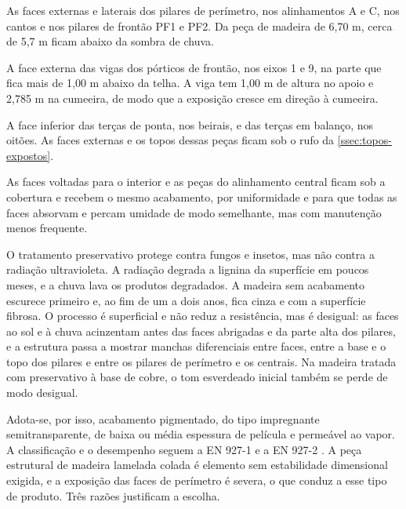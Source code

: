 \begin{alineas}
    \item As faces externas e laterais dos pilares de perímetro, nos alinhamentos
          A e C, nos cantos e nos pilares de frontão PF1 e PF2. Da peça de
          madeira de 6,70 m, cerca de 5,7 m ficam abaixo da sombra de chuva.
    \item A face externa das vigas dos pórticos de frontão, nos eixos 1 e 9, na
          parte que fica mais de 1,00 m abaixo da telha. A viga tem 1,00 m de
          altura no apoio e 2,785 m na cumeeira, de modo que a exposição cresce
          em direção à cumeeira.
    \item A face inferior das terças de ponta, nos beirais, e das terças em
          balanço, nos oitões. As faces externas e os topos dessas peças ficam
          sob o rufo da \autoref{ssec:topos-expostos}.
\end{alineas}

As faces voltadas para o interior e as peças do alinhamento central ficam sob a
cobertura e recebem o mesmo acabamento, por uniformidade e para que todas as faces
absorvam e percam umidade de modo semelhante, mas com manutenção menos frequente.

O tratamento preservativo protege contra fungos e insetos, mas não contra a
radiação ultravioleta. A radiação degrada a lignina da superfície em poucos meses,
e a chuva lava os produtos degradados. A madeira sem acabamento escurece primeiro
e, ao fim de um a dois anos, fica cinza e com a superfície fibrosa. O processo é
superficial e não reduz a resistência, mas é desigual: as faces ao sol e à chuva
acinzentam antes das faces abrigadas e da parte alta dos pilares, e a estrutura
passa a mostrar manchas diferenciais entre faces, entre a base e o topo dos pilares
e entre os pilares de perímetro e os centrais. Na madeira tratada com
preservativo à base de cobre, o tom esverdeado inicial também se perde de modo
desigual.

Adota-se, por isso, acabamento pigmentado, do tipo impregnante semitransparente,
de baixa ou média espessura de película e permeável ao vapor. A classificação e o
desempenho seguem a EN 927-1 \cite{EN927-1:2013} e a EN 927-2
\cite{EN927-2:2014}. A peça estrutural de madeira lamelada colada é elemento sem
estabilidade dimensional exigida, e a exposição das faces de perímetro é severa,
o que conduz a esse tipo de produto. Três razões justificam a escolha.

